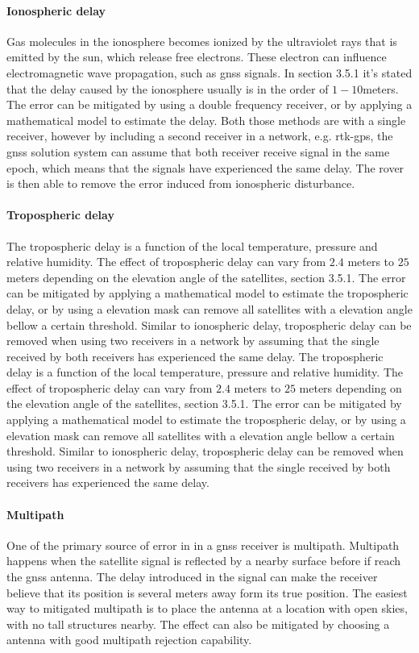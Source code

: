 \paragraph{Ionospheric delay}
Gas molecules in the ionosphere becomes ionized by the ultraviolet rays that is emitted by the sun, which release free electrons. These electron can influence electromagnetic wave propagation, such as \gls{gnss} signals. In \citep{vik2014integrated} section 3.5.1 it's stated that the delay caused by the ionosphere usually is in the order of $1-10 $meters. The error can be mitigated by using a double frequency receiver, or by applying a mathematical model to estimate the delay. Both those methods are with a single receiver, however by including a second receiver in a network, e.g. \gls{rtk-gps}, the \gls{gnss} solution system can assume that both receiver receive signal in the same epoch, which means that the signals have experienced the same delay. The rover is then able to remove the error induced from ionospheric disturbance.
\paragraph{Tropospheric delay}
The tropospheric delay is a function of the local temperature, pressure and relative humidity. The effect of tropospheric delay can  vary from $2.4$ meters to $25$ meters depending on the elevation angle of the satellites,\citep{vik2014integrated} section 3.5.1. The error can be mitigated by applying a mathematical model to estimate the tropospheric delay, or by using a elevation mask can remove all satellites with a elevation angle bellow a certain threshold. Similar to ionospheric delay, tropospheric delay can be removed when using two receivers in a network by assuming that the single received by both receivers has experienced the same delay. 
The tropospheric delay is a function of the local temperature, pressure and relative humidity. The effect of tropospheric delay can  vary from $2.4$ meters to $25$ meters depending on the elevation angle of the satellites,\citep{vik2014integrated} section 3.5.1. The error can be mitigated by applying a mathematical model to estimate the tropospheric delay, or by using a elevation mask can remove all satellites with a elevation angle bellow a certain threshold. Similar to ionospheric delay, tropospheric delay can be removed when using two receivers in a network by assuming that the single received by both receivers has experienced the same delay. 

\paragraph{Multipath}
One of the primary source of error in in a \gls{gnss} receiver is multipath. Multipath happens when the satellite signal is reflected by a nearby surface before if reach the \gls{gnss} antenna. The delay introduced in the signal can make the receiver believe that its position is several meters away form its true position. The easiest way to mitigated multipath is to place the antenna at a location with open skies, with no tall structures nearby. The effect can also be mitigated by choosing a antenna with good multipath rejection capability.


